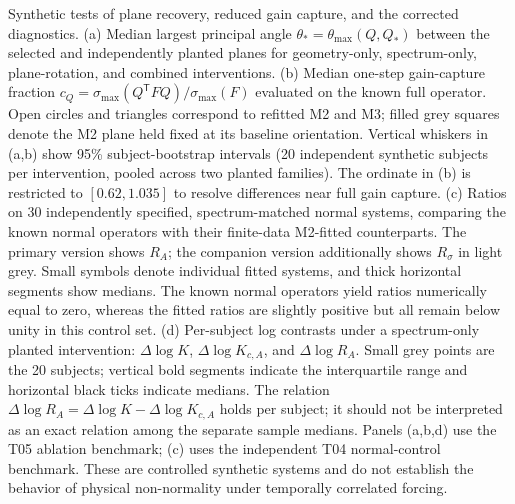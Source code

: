 \caption{Synthetic tests of plane recovery, reduced gain capture, and the corrected diagnostics. (a) Median largest principal angle $\theta_*=\theta_{\max}(Q,Q_*)$ between the selected and independently planted planes for geometry-only, spectrum-only, plane-rotation, and combined interventions. (b) Median one-step gain-capture fraction $c_Q=\sigma_{\max}(Q^{\mathsf T}FQ)/\sigma_{\max}(F)$ evaluated on the known full operator. Open circles and triangles correspond to refitted M2 and M3; filled grey squares denote the M2 plane held fixed at its baseline orientation. Vertical whiskers in (a,b) show 95\% subject-bootstrap intervals (20 independent synthetic subjects per intervention, pooled across two planted families). The ordinate in (b) is restricted to $[0.62,1.035]$ to resolve differences near full gain capture. (c) Ratios on 30 independently specified, spectrum-matched normal systems, comparing the known normal operators with their finite-data M2-fitted counterparts. The primary version shows $R_A$; the companion version additionally shows $R_\sigma$ in light grey. Small symbols denote individual fitted systems, and thick horizontal segments show medians. The known normal operators yield ratios numerically equal to zero, whereas the fitted ratios are slightly positive but all remain below unity in this control set. (d) Per-subject log contrasts under a spectrum-only planted intervention: $\Delta\log K$, $\Delta\log K_{c,A}$, and $\Delta\log R_A$. Small grey points are the 20 subjects; vertical bold segments indicate the interquartile range and horizontal black ticks indicate medians. The relation $\Delta\log R_A=\Delta\log K-\Delta\log K_{c,A}$ holds per subject; it should not be interpreted as an exact relation among the separate sample medians. Panels (a,b,d) use the T05 ablation benchmark; (c) uses the independent T04 normal-control benchmark. These are controlled synthetic systems and do not establish the behavior of physical non-normality under temporally correlated forcing.}
